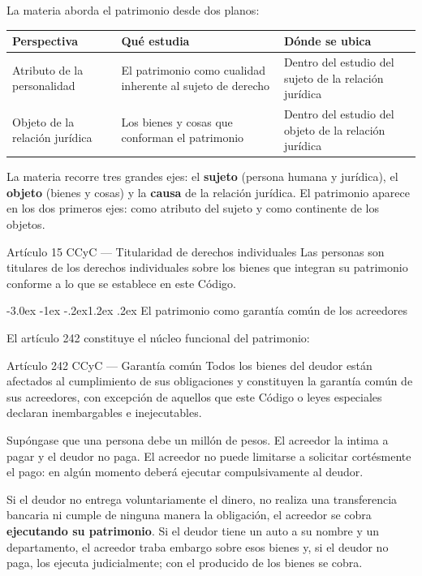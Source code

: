 \documentclass[12pt,oneside]{book}
\makeatletter
\renewcommand\section{\@startsection{section}{1}{\z@}%
  {-3.0ex \@plus -1ex \@minus -.2ex}{1.2ex \@plus .2ex}%
  {\normalfont\large\bfseries\color{acento}}}
\newenvironment{tabla}{%
    \par\medskip\begingroup\small\renewcommand{\arraystretch}{1.3}\noindent\ignorespaces
}{%
    \par\endgroup\medskip
}
\makeatother
\begin{document}
La materia aborda el patrimonio desde dos planos:

\begin{tabla}
\begin{tabularx}{\textwidth}{B{3.4cm}YY}
\toprule
Perspectiva & \textbf{Qué estudia} & \textbf{Dónde se ubica} \\
\midrule
Atributo de la personalidad & El patrimonio como cualidad inherente al sujeto de derecho & Dentro del estudio del sujeto de la relación jurídica \\
Objeto de la relación jurídica & Los bienes y cosas que conforman el patrimonio & Dentro del estudio del objeto de la relación jurídica \\
\bottomrule
\end{tabularx}
\end{tabla}

La materia recorre tres grandes ejes: el \textbf{sujeto} (persona humana y jurídica), el \textbf{objeto} (bienes y cosas) y la \textbf{causa} de la relación jurídica. El patrimonio aparece en los dos primeros ejes: como atributo del sujeto y como continente de los objetos.

\begin{norma}{Artículo 15 CCyC --- Titularidad de derechos individuales}
Las personas son titulares de los derechos individuales sobre los bienes que integran su patrimonio conforme a lo que se establece en este Código.
\end{norma}

\section{El patrimonio como garantía común de los acreedores}

El artículo 242 constituye el núcleo funcional del patrimonio:

\begin{norma}{Artículo 242 CCyC --- Garantía común}
Todos los bienes del deudor están afectados al cumplimiento de sus obligaciones y constituyen la garantía común de sus acreedores, con excepción de aquellos que este Código o leyes especiales declaran inembargables e inejecutables.
\end{norma}

\begin{ejemplo}
Supóngase que una persona debe un millón de pesos. El acreedor la intima a pagar y el deudor no paga. El acreedor no puede limitarse a solicitar cortésmente el pago: en algún momento deberá ejecutar compulsivamente al deudor.

Si el deudor no entrega voluntariamente el dinero, no realiza una transferencia bancaria ni cumple de ninguna manera la obligación, el acreedor se cobra \textbf{ejecutando su patrimonio}. Si el deudor tiene un auto a su nombre y un departamento, el acreedor traba embargo sobre esos bienes y, si el deudor no paga, los ejecuta judicialmente; con el producido de los bienes se cobra.
\end{ejemplo}
\end{document}
